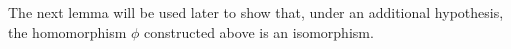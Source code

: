 \documentclass[12pt, reqno]{amsart}
\theoremstyle{definition}
\theoremstyle{remark}
\numberwithin{equation}{section}
\newcommand{\G}{\mathcal{G}}
\begin{document}






The next lemma will be used later to show that, under an additional hypothesis, the
homomorphism $\phi$ constructed above is an isomorphism.
\end{document}
